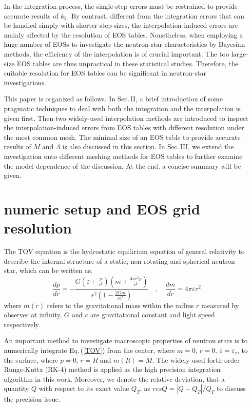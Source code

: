 \documentclass[preprint,tightenlines,eqsecnum,floats,aps,amsmath,amssymb,nofootinbib,prd,showpacs]{revtex4}
\begin{document}
In the integration process, the single-step errors must be restrained to provide accurate results of $k_2$. By contrast, different from the integration errors that can be handled simply with shorter step-sizes, the interpolation-induced errors are mainly affected by the resolution of EOS tables. Nonetheless, when employing a huge number of EOSs to investigate the neutron-star characteristics by Bayesian methods, the efficiency of the interpolation is of crucial important. The too large-size EOS tables are thus unpractical in these statistical studies. Therefore, the suitable resolution for EOS tables can be significant in neutron-star investigations.


This paper is organized as follows. In Sec.$\,$II, a brief introduction of some pragmatic techniques to deal with both the integration and the interpolation is given first. Then two widely-used interpolation methods are introduced to inspect the interpolation-induced errors from EOS tables with different resolution under the most common mesh. The minimal size of an EOS table to provide accurate results of $M$ and $\Lambda$ is also discussed in this section. In Sec.$\,$III, we extend the investigation onto different meshing methods for EOS tables to further examine the model-dependence of the discussion. At the end, a concise summary will be given.


\section{numeric setup and EOS grid resolution}

The TOV equation is the hydrostatic equilirium equation of general relativity to describe the internal structure of a static, non-rotating and spherical neutron star, which can be written as,
\begin{equation} \label{TOV}
\frac{{dp}}{{dr}} =  - \frac{{G(\varepsilon + \frac{{p}}{{{c^2}}})(m + \frac{{4\pi {r^3}p}}{{{c^2}}})}}{{{r^2}(1 - \frac{{2Gm}}{{r{c^2}}})}} \quad , \quad \frac{{dm}}{{dr}} = 4\pi \varepsilon {r^2}
\end{equation}
where  $m(r)$ refers to the gravitational mass within the radius $r$ measured by observer at infinity, $G$ and $c$ are gravitational constant and light speed respectively.

An important method to investigate macroscopic properties of neutron stars is to numerically integrate Eq.$\,$(\ref{TOV}) from the center, where $m=0$, $r=0$, $\varepsilon = \varepsilon_c$, to the surface, where $p=0$, $r=R$ and $m(R)=M$. The widely used forth-order Runge-Kutta (RK-4) method  is applied as the high precision integration algorithm in this work. Moreover, we denote the relative deviation, that a quantity $Q$ with respect to its exact value $Q_T$, as $resQ=\left| Q-Q_T \right|/Q_T$ to discuss the precision issue.
\end{document}
